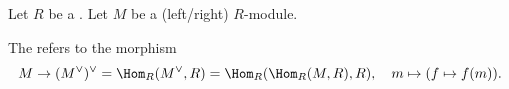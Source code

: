 \begin{definition} \label{definition:canonical_map_from_a_module_to_its_double_dual}
    Let $R$ be a . Let $M$ be a (left/right) $R$-module. 

    The  refers to the morphism
    $$M \to (M^\vee)^{\vee} = \Hom_R(M^\vee, R) = \Hom_R(\Hom_R(M, R), R), \quad m \mapsto (f \mapsto f(m)).$$
\end{definition}